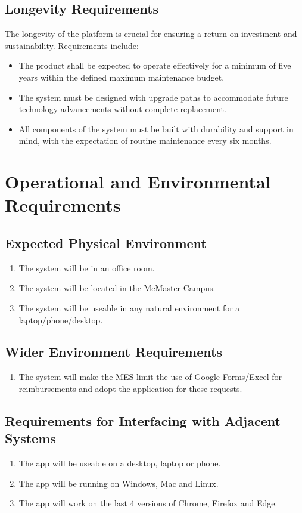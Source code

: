 \documentclass[12pt]{article}
\begin{document}
\subsection{Longevity Requirements}
The longevity of the platform is crucial for ensuring a return on investment and sustainability. Requirements include:

\begin{itemize}
    \item The product shall be expected to operate effectively for a minimum of five years within the defined maximum maintenance budget.
    \item The system must be designed with upgrade paths to accommodate future technology advancements without complete replacement.
    \item All components of the system must be built with durability and support in mind, with the expectation of routine maintenance every six months.
\end{itemize}


\section{Operational and Environmental Requirements}
\subsection{Expected Physical Environment}
\begin{enumerate}
  \item The system will be in an office room.
  \item The system will be located in the McMaster Campus. 
  \item The system will be useable in any natural environment for a laptop/phone/desktop. 
\end{enumerate}
\subsection{Wider Environment Requirements}
\begin{enumerate}
  \item The system will make the MES limit the use of Google Forms/Excel for reimbursements and adopt the application for these requests.
\end{enumerate}

\subsection{Requirements for Interfacing with Adjacent Systems}
\begin{enumerate}
  \item The app will be useable on a desktop, laptop or phone.
  \item The app will be running on Windows, Mac and Linux. 
  \item The app will work on the last 4 versions of Chrome, Firefox and Edge. 
\end{enumerate}
\end{document}
